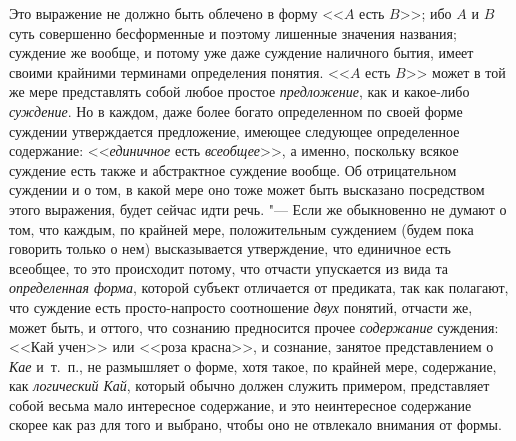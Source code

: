 Это выражение не должно быть облечено в форму
<<$A$ есть $B$>>; ибо $A$ и $B$ суть совершенно
бесформенные и поэтому лишенные значения названия; суждение
же вообще, и потому уже даже суждение наличного бытия, имеет своими
крайними терминами определения понятия.
<<$A$ есть $B$>> может в той же
мере представлять собой любое простое
{\em предложение}, как и какое-либо {\em суждение}.
Но в каждом, даже более богато определенном по своей форме
суждении утверждается предложение, имеющее следующее определенное
содержание: <<{\em единичное} есть {\em всеобщее}>>,
а именно, поскольку всякое суждение есть также и абстрактное
суждение вообще. Об отрицательном суждении и о том, в какой мере оно тоже
может быть высказано посредством этого выражения, будет сейчас идти речь.
"--- Если же обыкновенно не думают о том, что каждым, по крайней
мере, положительным суждением (будем пока говорить только о нем)
высказывается утверждение, что единичное есть всеобщее, то это происходит
потому, что отчасти упускается из вида та
{\em определенная форма},
которой субъект отличается от предиката, так как полагают,
что суждение есть просто-напросто соотношение
{\em двух} понятий,
отчасти же, может быть, и оттого, что сознанию предносится прочее
{\em содержание}
суждения: <<Кай учен>> или <<роза красна>>, и сознание, занятое
представлением о {\em Кае}
и~т.~п., не размышляет о форме, хотя такое, по крайней мере,
содержание, как {\em логический Кай},
который обычно должен служить примером, представляет собой
весьма мало интересное содержание, и это неинтересное содержание скорее как
раз для того и выбрано, чтобы оно не отвлекало внимания от
формы.

